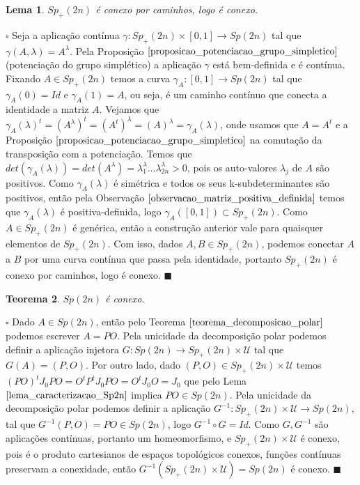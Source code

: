 \documentclass[12pt]{book}
\newtheorem{teorema}{Teorema}[section]
\newtheorem{lema}[teorema]{Lema}
\newenvironment{prova}[1]{$\square$ #1}{\hfill$\blacksquare$}
\newcommand{\gruposimpletico}[1]{Sp(#1)}
\newcommand{\gruposimpleticopositivo}[1]{Sp_{+}(#1)}
\begin{document}
	\begin{lema}
		$\gruposimpleticopositivo{2n}$ é conexo por caminhos, logo é conexo.
	\end{lema}
	\begin{prova}
		Seja a aplicação contínua $\gamma:\gruposimpleticopositivo{2n}\times [0,1] \to \gruposimpletico{2n}$ tal que $\gamma(A,\lambda) = A^{\lambda}$. Pela Proposição $\ref{proposicao_potenciacao_grupo_simpletico}$ (potenciação do grupo simplético) a aplicação $\gamma$ está bem-definida e é contínua. Fixando $A \in \gruposimpleticopositivo{2n}$ temos a curva $\gamma_{A}:[0,1]\to \gruposimpletico{2n}$ tal que $\gamma_{A}(0) = Id$ e $\gamma_{A}(1) = A$, ou seja, é um caminho contínuo que conecta a identidade a matriz $A$. Vejamos que $\gamma_{A}(\lambda)^{t} = (A^{\lambda})^{t} = (A^{t})^{\lambda} = (A)^{\lambda} = \gamma_{A}(\lambda)$, onde usamos que $A=A^{t}$ e a Proposição $\ref{proposicao_potenciacao_grupo_simpletico}$ na comutação da transposição com a potenciação. Temos que $det(\gamma_{A}(\lambda)) = det(A^{\lambda}) = \lambda_{1}^{\lambda}\dots\lambda_{2n}^{\lambda}>0$, pois os auto-valores $\lambda_{j}$ de $A$ são positivos. Como $\gamma_{A}(\lambda)$ é simétrica e todos os seus k-subdeterminantes são positivos, então pela Observação $\ref{observacao_matriz_positiva_definida}$ temos que $\gamma_{A}(\lambda)$ é positiva-definida, logo $\gamma_{A}([0,1]) \subset \gruposimpleticopositivo{2n}$. Como $A \in \gruposimpleticopositivo{2n}$ é genérica, então a construção anterior vale para quaisquer elementos de $\gruposimpleticopositivo{2n}$. Com isso, dados $A, B \in \gruposimpleticopositivo{2n}$, podemos conectar $A$ a $B$ por uma curva contínua que passa pela identidade, portanto $\gruposimpleticopositivo{2n}$ é conexo por caminhos, logo é conexo.
	\end{prova}	
	
	\begin{teorema}\label{teoerma_sp2n_conexo}
		$\gruposimpletico{2n}$ é conexo.
	\end{teorema}
	\begin{prova}
		Dado $A \in \gruposimpletico{2n}$, então pelo Teorema $\ref{teorema_decomposicao_polar}$ podemos escrever $A=PO$. Pela unicidade da decomposição polar podemos definir a aplicação injetora $G: \gruposimpletico{2n} \to \gruposimpleticopositivo{2n} \times \mathcal{U}$ tal que $G(A) = (P,O)$. Por outro lado, dado $(P,O) \in \gruposimpleticopositivo{2n} \times \mathcal{U}$ temos $(PO)^{t}J_{0}PO = O^{t}P^{t}J_{0}PO = O^{t}J_{0}O = J_{0}$ que pelo Lema $\ref{lema_caracterizacao_Sp2n}$ implica $PO \in \gruposimpletico{2n}$. Pela unicidade da decomposição polar podemos definir a aplicação $G^{-1}:\gruposimpleticopositivo{2n}\times \mathcal{U} \to \gruposimpletico{2n}$, tal que $G^{-1}(P,O) = PO \in \gruposimpletico{2n}$, logo $G^{-1} \circ G =Id$. Como $G, G^{-1}$ são aplicações contínuas, portanto um homeomorfismo, e $\gruposimpleticopositivo{2n}\times \mathcal{U}$ é conexo, pois é o produto cartesianos de espaços topológicos conexos, funções contínuas preservam a conexidade, então $G^{-1}(\gruposimpleticopositivo{2n}\times \mathcal{U}) = \gruposimpletico{2n}$ é conexo.
	\end{prova}
	
\end{document}
